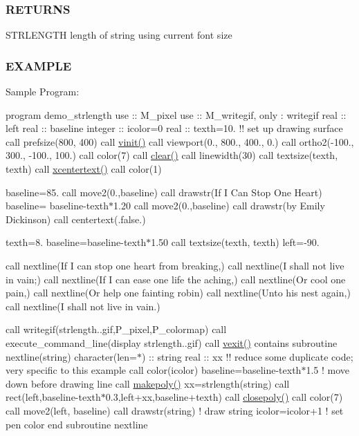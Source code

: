 \subsubsection*{R\+E\+T\+U\+R\+NS}

S\+T\+R\+L\+E\+N\+G\+TH length of string using current font size

\subsubsection*{E\+X\+A\+M\+P\+LE}

Sample Program\+:

program demo\+\_\+strlength use \+:\+: M\+\_\+pixel use \+:\+: M\+\_\+writegif, only \+: writegif real \+:\+: left real \+:\+: baseline integer \+:\+: icolor=0 real \+:\+: texth=10. !! set up drawing surface call prefsize(800, 400) call \hyperlink{namespacem__pixel_ac03ca8f23fdadb60599b6ea4dc87a6d9}{vinit()} call viewport(0., 800., 400., 0.) call ortho2(-\/100., 300., -\/100., 100.) call color(7) call \hyperlink{namespacem__pixel_af3b81a21a0b2f6b5eddd09c031bd6173}{clear()} call linewidth(30) call textsize(texth, texth) call \hyperlink{namespacem__pixel_a1e0c43d36b35eafea921f91c31d8a478}{xcentertext()} call color(1)

baseline=85. call move2(0.,baseline) call drawstr(\textquotesingle{}If I Can Stop One Heart\textquotesingle{}) baseline= baseline-\/texth$\ast$1.20 call move2(0.,baseline) call drawstr(\textquotesingle{}by Emily Dickinson\textquotesingle{}) call centertext(.false.)

texth=8. baseline=baseline-\/texth$\ast$1.50 call textsize(texth, texth) left=-\/90.

call nextline(\textquotesingle{}If I can stop one heart from breaking,\textquotesingle{}) call nextline(\textquotesingle{}I shall not live in vain;\textquotesingle{}) call nextline(\textquotesingle{}If I can ease one life the aching,\textquotesingle{}) call nextline(\textquotesingle{}Or cool one pain,\textquotesingle{}) call nextline(\textquotesingle{}Or help one fainting robin\textquotesingle{}) call nextline(\textquotesingle{}Unto his nest again,\textquotesingle{}) call nextline(\textquotesingle{}I shall not live in vain.\textquotesingle{})

call writegif(\textquotesingle{}strlength..\+gif\textquotesingle{},P\+\_\+pixel,P\+\_\+colormap) call execute\+\_\+command\+\_\+line(\textquotesingle{}display strlength..\+gif\textquotesingle{}) call \hyperlink{namespacem__pixel_a19ad6b65752322b0029a62cc0ebec3e8}{vexit()} contains subroutine nextline(string) character(len=$\ast$) \+:\+: string real \+:\+: xx !! reduce some duplicate code; very specific to this example call color(icolor) baseline=baseline-\/texth$\ast$1.5 ! move down before drawing line call \hyperlink{namespacem__pixel_ab7128437f95b40004bf73fc6e3f597f8}{makepoly()} xx=strlength(string) call rect(left,baseline-\/texth$\ast$0.3,left+xx,baseline+texth) call \hyperlink{namespacem__pixel_ab3dc83b63d2ab1bf3f63932abca4245d}{closepoly()} call color(7) call move2(left, baseline) call drawstr(string) ! draw string icolor=icolor+1 ! set pen color end subroutine nextline

